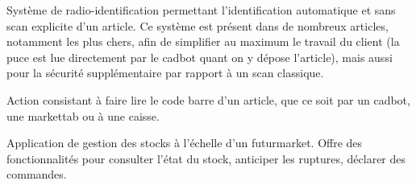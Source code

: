 Système de radio-identification permettant l'identification automatique et sans scan explicite d'un article.
Ce système est présent dans de nombreux articles, notamment les plus chers, afin de simplifier au maximum le travail du client (la puce est lue directement par le cadbot quant on y dépose l'article), mais aussi pour la sécurité supplémentaire par rapport à un scan classique.
\par

Action consistant à faire lire le code barre d'un article, que ce soit par un cadbot, une markettab ou à une caisse.
\par

Application de gestion des stocks à l'échelle d'un futurmarket.
Offre des fonctionnalités pour consulter l'état du stock, anticiper les ruptures, déclarer des commandes.
\par
